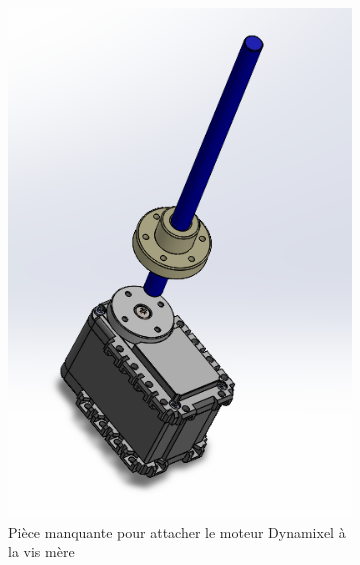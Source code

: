 \documentclass[a4paper, 11pt]{report}
\begin{document}
            \begin{figure}
                \centering
                \begin{subfigure}[t]{0.4\textwidth}
                    \centering
                    \includegraphics[width=\textwidth]{Figures/piece_manquante.png}
                    \caption{Pièce manquante pour attacher le moteur Dynamixel à la vis mère}
                    \label{fig:piece_manquante}
                \end{subfigure}
                \hfill
                \begin{subfigure}[t]{0.3\textwidth}
                    \centering

\end{subfigure}
\end{figure}
\end{document}
